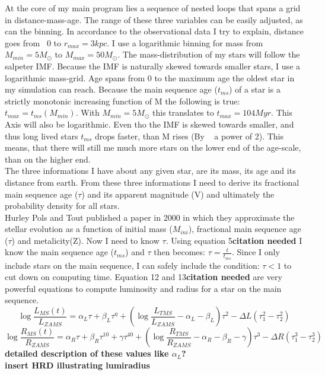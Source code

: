 \documentclass[a4paper,10pt]{article}
\begin{document}
 At the core of my main program lies a sequence of nested loops that spans a grid in distance-mass-age. The range of these three
 variables can be easily adjusted, as can the binning. In accordance to the observational data I try to explain, distance goes from \
 0 to $r_{max}=3kpc$. I use a logarithmic binning for mass 
 from $M_{min}=5M_\odot$ to $M_{max}=50M_\odot$. The mass-distribution of my stars will follow the salpeter IMF. Because the IMF is
 naturally skewed towards smaller stars, I use a logarithmic mass-grid. Age spans from 0 to the maximum age the oldest star in my 
 simulation can reach. Because the main sequence age ($t_{ms}$) of a star 
 is a strictly monotonic increasing function of M the following is true: $t_{max}=t_{ms}(M_{min})$. With $M_{min}=5M_\odot$ this 
 translates to $t_{max}=104Myr$. This Axis will also be logarithmic. Even tho the IMF is skewed towards smaller, and thus long lived stars
 $t_{ms}$ drops faster, than M rises (By ~ a power of 2). This means, that there will still me much more stars on the lower 
 end of the age-scale, than on the higher end.\\
 The three informations I have about any given star, are its mass, its age and its distance from earth. From these three informations
 I need to derive its fractional main sequence age ($\tau$) and its apparent magnitude (V) and ultimately the probability density
 for all stars.\\ 
 Hurley Pols and Tout published a paper in 2000 in which they approximate the stellar evolution as a function of initial mass ($M_{ini}$),
 fractional main sequence age ($\tau$) and metalicity(Z). Now I need to know $\tau$. Using equation 5\textbf{citation needed} I know the 
 main sequence age 
 ($t_{ms}$) and $\tau$ then becomes: $\tau=\frac{t}{t_{ms}}$. Since I only include stars on the main sequence, I can safely include
 the condition: $\tau<1$ to cut down on computing time.
 Equation 12 and 13\textbf{citation needed} are very powerful equations to compute luminosity
 and radius for a star on the main sequence.
 \begin{equation}
  \log\frac{L_{MS}(t)}{L_{ZAMS}}=\alpha_L\tau+\beta_L\tau^\eta+\left(\log\frac{L_{TMS}}{L_{ZAMS}}-\alpha_L-\beta_L\right)\tau^2-\Delta L(\tau_1^2-\tau_2^2)
  \label{logL}
 \end{equation}
 \begin{equation}
  \log\frac{R_{MS}(t)}{R_{ZAMS}}=\alpha_R\tau+\beta_R\tau^{10}+\gamma\tau^{40}+\left(\log\frac{R_{TMS}}{R_{ZAMS}}-\alpha_R-\beta_R-\gamma\right)\tau^3-\Delta R(\tau_1^3-\tau_2^3)
  \label{logR}
 \end{equation}
 \textbf{detailed description of these values like $\alpha_L$?} \\
 \textbf{insert HRD illustrating lumiradius}\\
 
\end{document}
